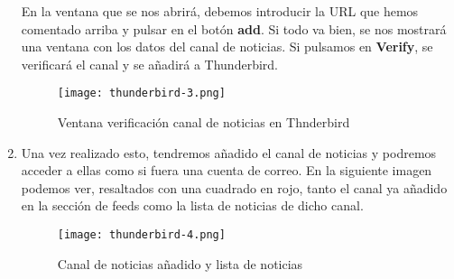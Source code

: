 \begin{enumerate}
    En la ventana que se nos abrirá, debemos introducir la URL que hemos comentado arriba y pulsar en el botón \textbf{add}. Si todo va bien, se nos mostrará una ventana con los datos del canal de noticias. Si pulsamos en \textbf{Verify}, se verificará el canal y se añadirá a Thunderbird.

    \begin{figure}[H]
        \centering
        \texttt{[image: thunderbird-3.png]}
        \caption{Ventana verificación canal de noticias en Thnderbird}
    \end{figure}

    \item Una vez realizado esto, tendremos añadido el canal de noticias y podremos acceder a ellas como si fuera una cuenta de correo. En la siguiente imagen podemos ver, resaltados con una cuadrado en rojo, tanto el canal ya añadido en la sección de feeds como la lista de noticias de dicho canal.

    \begin{figure}[H]
        \centering
        \texttt{[image: thunderbird-4.png]}
        \caption{Canal de noticias añadido y lista de noticias}
    \end{figure}
\end{enumerate}



%
%

